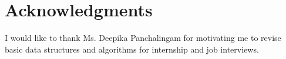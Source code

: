 \documentclass[letterpaper,12pt]{report}
\begin{document}
%


\chapter*{Acknowledgments}
\label{chp:Acknowledgments}

I would like to thank Ms. Deepika Panchalingam for motivating me to revise basic data structures and algorithms for internship and job interviews.




%
%
%
\appendix

{\linespread{1}

%

}
\end{document}
